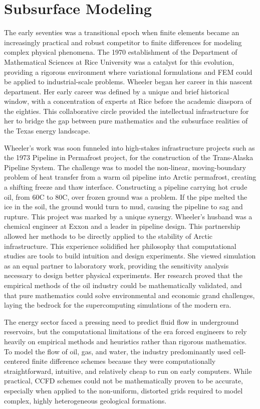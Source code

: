 \section{Subsurface Modeling}

The early seventies was a transitional epoch when finite elements became an increasingly practical and robust competitor to finite differences for modeling complex physical phenomena. The 1970 establishment of the Department of Mathematical Sciences at Rice University was a catalyst for this evolution, providing a rigorous environment where variational formulations and FEM could be applied to industrial-scale problems. Wheeler began her career in this nascent department. Her early career was defined by a unique and brief historical window, with a concentration of experts at Rice before the academic diaspora of the eighties. This collaborative circle provided the intellectual infrastructure for her to bridge the gap between pure mathematics and the subsurface realities of the Texas energy landscape.

Wheeler’s work was soon funneled into high-stakes infrastructure projects such as the 1973 Pipeline in Permafrost project, for the construction of the Trans-Alaska Pipeline System. The challenge was to model the non-linear, moving-boundary problem of heat transfer from a warm oil pipeline into Arctic permafrost, creating a shifting freeze and thaw interface. Constructing a pipeline carrying hot crude oil, from 60C to 80C, over frozen ground was a problem. If the pipe melted the ice in the soil, the ground would turn to mud, causing the pipeline to sag and rupture. This project was marked by a unique synergy. Wheeler’s husband was a chemical engineer at Exxon and a leader in pipeline design. This partnership allowed her methods to be directly applied to the stability of Arctic infrastructure. This experience solidified her philosophy that computational studies are tools to build intuition and design experiments. She viewed simulation as an equal partner to laboratory work, providing the sensitivity analysis necessary to design better physical experiments. Her research proved that the empirical methods of the oil industry could be mathematically validated, and that pure mathematics could solve environmental and economic grand challenges, laying the bedrock for the supercomputing simulations of the modern era.

The energy sector faced a pressing need to predict fluid flow in underground reservoirs, but the computational limitations of the era forced engineers to rely heavily on empirical methods and heuristics rather than rigorous mathematics. To model the flow of oil, gas, and water, the industry predominantly used cell-centered finite difference schemes because they were computationally straightforward, intuitive, and relatively cheap to run on early computers. While practical, CCFD schemes could not be mathematically proven to be accurate, especially when applied to the non-uniform, distorted grids required to model complex, highly heterogeneous geological formations. 

